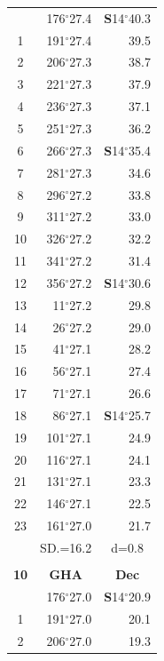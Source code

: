 \documentclass[10pt, a4paper]{report}
\begin{document}
\begin{scriptsize}
\begin{tabular*}{0.2\textwidth}[t]{@{\extracolsep{\fill}}|c|rr|}
\hline\rule{0pt}{2.6ex}\noindent
0 & 176$^\circ$27.4 & \textbf{S}14$^\circ$40.3\\
1 & 191$^\circ$27.4 & 39.5\\
2 & 206$^\circ$27.3 & 38.7\\
3 & 221$^\circ$27.3 & \raisebox{0.24ex}{\boldmath$\cdot$~\boldmath$\cdot$~~}37.9\\
4 & 236$^\circ$27.3 & 37.1\\
5 & 251$^\circ$27.3 & 36.2\\[2Pt]
6 & 266$^\circ$27.3 & \textbf{S}14$^\circ$35.4\\
7 & 281$^\circ$27.3 & 34.6\\
8 & 296$^\circ$27.2 & 33.8\\
9 & 311$^\circ$27.2 & \raisebox{0.24ex}{\boldmath$\cdot$~\boldmath$\cdot$~~}33.0\\
10 & 326$^\circ$27.2 & 32.2\\
11 & 341$^\circ$27.2 & 31.4\\[2Pt]
12 & 356$^\circ$27.2 & \textbf{S}14$^\circ$30.6\\
13 & 11$^\circ$27.2 & 29.8\\
14 & 26$^\circ$27.2 & 29.0\\
15 & 41$^\circ$27.1 & \raisebox{0.24ex}{\boldmath$\cdot$~\boldmath$\cdot$~~}28.2\\
16 & 56$^\circ$27.1 & 27.4\\
17 & 71$^\circ$27.1 & 26.6\\[2Pt]
18 & 86$^\circ$27.1 & \textbf{S}14$^\circ$25.7\\
19 & 101$^\circ$27.1 & 24.9\\
20 & 116$^\circ$27.1 & 24.1\\
21 & 131$^\circ$27.1 & \raisebox{0.24ex}{\boldmath$\cdot$~\boldmath$\cdot$~~}23.3\\
22 & 146$^\circ$27.1 & 22.5\\
23 & 161$^\circ$27.0 & 21.7\\
\hline
\rule{0pt}{2.4ex} & \multicolumn{1}{c}{SD.=16.2} & \multicolumn{1}{c|}{d=0.8}\\
\hline
\multicolumn{1}{c}{}\\[-0.5ex]\hline
\multicolumn{1}{|c|}{\rule{0pt}{2.6ex}\textbf{10}} & \multicolumn{1}{c}{\textbf{GHA}} & \multicolumn{1}{c|}{\textbf{Dec}}\\
\hline\rule{0pt}{2.6ex}\noindent
0 & 176$^\circ$27.0 & \textbf{S}14$^\circ$20.9\\
1 & 191$^\circ$27.0 & 20.1\\
2 & 206$^\circ$27.0 & 19.3\\

\end{tabular*}
\end{scriptsize}
\end{document}
